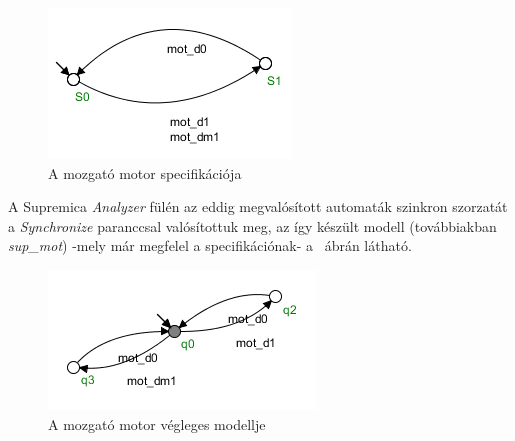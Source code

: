 \begin{figure}
	\centering
	\includegraphics[keepaspectratio]{figures/2m03/b_spec_motor.png}
	\caption{A mozgató motor specifikációja}
	\label{fig:SpecMot}
\end{figure}
A Supremica \textit{Analyzer} fülén az eddig megvalósított automaták szinkron szorzatát a \textit{Synchronize} paranccsal valósítottuk meg, az így készült modell (továbbiakban \textit{sup\_mot}) -mely már megfelel a specifikációnak- a ~ábrán látható.
\begin{figure}
	\centering
	\includegraphics[keepaspectratio]{figures/2m03/b_supmot.png}
	\caption{A mozgató motor végleges modellje}
	\label{fig:SupMot}
\end{figure}


\newpage

